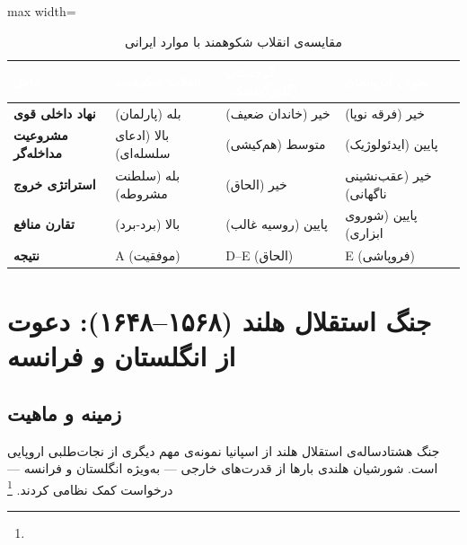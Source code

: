\begin{table}[htbp]
\centering
\caption{مقایسه‌ی انقلاب شکوهمند با موارد ایرانی}\label{tab:ch08-comparison}
\begin{adjustbox}{max width=\linewidth}
\begin{tabular}{
  >{\raggedleft\arraybackslash\bfseries}p{3cm}
  >{\raggedleft\arraybackslash}p{3.5cm}
  >{\raggedleft\arraybackslash}p{3.5cm}
  >{\raggedleft\arraybackslash}p{3.5cm}}
\toprule
\rowcolor{PrimaryDeep}
\textcolor{white}{عامل} &
\textcolor{white}{انقلاب شکوهمند} &
\textcolor{white}{گرجستان (گئورگیفسک)} &
\textcolor{white}{بحران آذربایجان} \\
\midrule

نهاد داخلی قوی &
\cellcolor{BgSuccess}بله (پارلمان) &
\cellcolor{BgFail}خیر (خاندان ضعیف) &
\cellcolor{BgFail}خیر (فرقه نوپا) \\
\rowcolor{NeutralLight}
مشروعیت مداخله‌گر &
\cellcolor{BgSuccess}بالا (ادعای سلسله‌ای) &
\cellcolor{BgWarm}متوسط (هم‌کیشی) &
\cellcolor{BgFail}پایین (ایدئولوژیک) \\
استراتژی خروج &
\cellcolor{BgSuccess}بله (سلطنت مشروطه) &
\cellcolor{BgFail}خیر (الحاق) &
\cellcolor{BgFail}خیر (عقب‌نشینی ناگهانی) \\
\rowcolor{NeutralLight}
تقارن منافع &
\cellcolor{BgSuccess}بالا (برد-برد) &
\cellcolor{BgFail}پایین (روسیه غالب) &
\cellcolor{BgFail}پایین (شوروی ابزاری) \\
نتیجه &
\cellcolor{BgSuccess}A (موفقیت) &
\cellcolor{BgFail}D–E (الحاق) &
\cellcolor{BgFail}E (فروپاشی) \\

\bottomrule
\end{tabular}
\end{adjustbox}
\end{table}

\section{جنگ استقلال هلند (۱۵۶۸–۱۶۴۸): دعوت از انگلستان و فرانسه}
\label{sec:ch08-dutch}

\subsection{زمینه و ماهیت}

جنگ هشتادساله‌ی استقلال هلند از اسپانیا نمونه‌ی مهم دیگری از نجات‌طلبی اروپایی است. شورشیان هلندی بارها از قدرت‌های خارجی — به‌ویژه انگلستان و فرانسه — درخواست کمک نظامی کردند.%
\footnote{}


